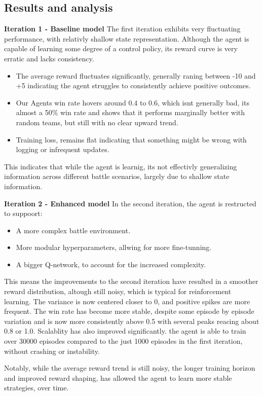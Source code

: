 \subsection{Results and analysis}
\textbf{Iteration 1 - Baseline model}
The first iteration exhibits very fluctuating performance, with relativly shallow 
state representation. Although the agent is capable of learning some degree of a control
policy, its reward curve is very erratic and lacks consistency.
\begin{itemize}
    \item The average reward fluctuates significantly, generally raning between -10 and +5
    indicating the agent struggles to consistently achieve positive outcomes.
    \item Our Agents win rate hovers around 0.4 to 0.6, which isnt generally bad, its almost a 50\% win rate
    and shows that it performs marginally better with random teams, but still with no clear upward trend.
    \item Training loss, remains flat indicating that something might be wrong with logging or infrequent updates.
\end{itemize}
This indicates that while the agent is learnig, its not effectivly generalizing 
information across different battle scenarios, largely due to shallow state information.

\textbf{Iteration 2 - Enhanced model}
In the second iteration, the agent is restructed to suppoort:
\begin{itemize}
    \item A more complex battle environment.
    \item More modular hyperparameters, allwing for more fine-tunning.
    \item A bigger Q-network, to account for the increased complexity.
\end{itemize}
This means the improvements to the second iteration have resulted in a smoother reward
distribution, altough still noisy, which is typical for reinforcement learning. The variance
is now centered closer to 0, and positive spikes are more frequent. The win rate 
has become more stable, despite some episode by episode variation 
and is now more consistently above 0.5 with several peaks reacing about 0.8 or 1.0.
Scalablity has also improved significantly. the agent is able to train over 30000 episodes
compared to the just 1000 episodes in the first iteration, without crashing or instability.

Notably, while the average reward trend is still noisy, the longer training horizon
and improved reward shaping, has allowed the agent to learn more stable strategies, over time.

